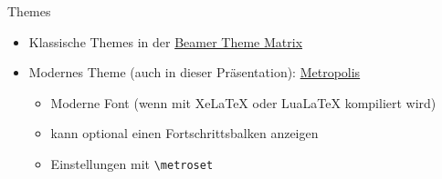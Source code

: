 \documentclass[presentation,aspectratio=169]{beamer}
\begin{document}
\begin{frame}[fragile]{Themes}
  \begin{itemize}
    \item Klassische Themes in der \href{https://hartwork.org/beamer-theme-matrix/}{Beamer Theme Matrix}
    \item Modernes Theme (auch in dieser Präsentation): \href{https://ctan.org/pkg/beamertheme-metropolis}{Metropolis}
      \begin{itemize}
        \item Moderne Font (wenn mit Xe\LaTeX{} oder Lua\LaTeX{} kompiliert wird)
        \item kann optional einen Fortschrittsbalken anzeigen
        \item Einstellungen mit \verb|\metroset|
      \end{itemize}
  \end{itemize}
\end{frame}
\end{document}
